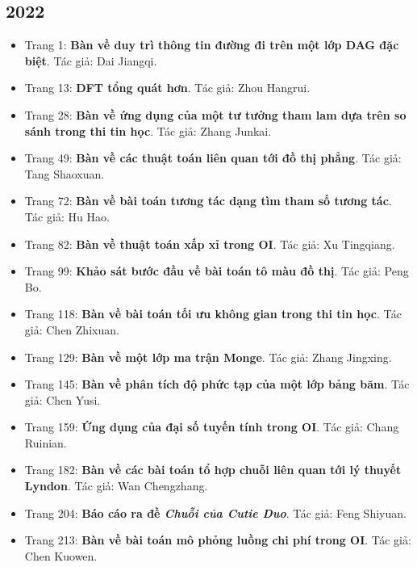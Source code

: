 \documentclass[11pt]{article}
\begin{document}
\subsection{2022}
\begin{itemize}[leftmargin=2em]
  \item Trang 1: \textbf{Bàn về duy trì thông tin đường đi trên một lớp DAG đặc biệt}. Tác giả: Dai Jiangqi.
  \item Trang 13: \textbf{DFT tổng quát hơn}. Tác giả: Zhou Hangrui.
  \item Trang 28: \textbf{Bàn về ứng dụng của một tư tưởng tham lam dựa trên so sánh trong thi tin học}. Tác giả: Zhang Junkai.
  \item Trang 49: \textbf{Bàn về các thuật toán liên quan tới đồ thị phẳng}. Tác giả: Tang Shaoxuan.
  \item Trang 72: \textbf{Bàn về bài toán tương tác dạng tìm tham số tương tác}. Tác giả: Hu Hao.
  \item Trang 82: \textbf{Bàn về thuật toán xấp xỉ trong OI}. Tác giả: Xu Tingqiang.
  \item Trang 99: \textbf{Khảo sát bước đầu về bài toán tô màu đồ thị}. Tác giả: Peng Bo.
  \item Trang 118: \textbf{Bàn về bài toán tối ưu không gian trong thi tin học}. Tác giả: Chen Zhixuan.
  \item Trang 129: \textbf{Bàn về một lớp ma trận Monge}. Tác giả: Zhang Jingxing.
  \item Trang 145: \textbf{Bàn về phân tích độ phức tạp của một lớp bảng băm}. Tác giả: Chen Yusi.
  \item Trang 159: \textbf{Ứng dụng của đại số tuyến tính trong OI}. Tác giả: Chang Ruinian.
  \item Trang 182: \textbf{Bàn về các bài toán tổ hợp chuỗi liên quan tới lý thuyết Lyndon}. Tác giả: Wan Chengzhang.
  \item Trang 204: \textbf{Báo cáo ra đề \emph{Chuỗi của Cutie Duo}}. Tác giả: Feng Shiyuan.
  \item Trang 213: \textbf{Bàn về bài toán mô phỏng luồng chi phí trong OI}. Tác giả: Chen Kuowen.
\end{itemize}
\end{document}
